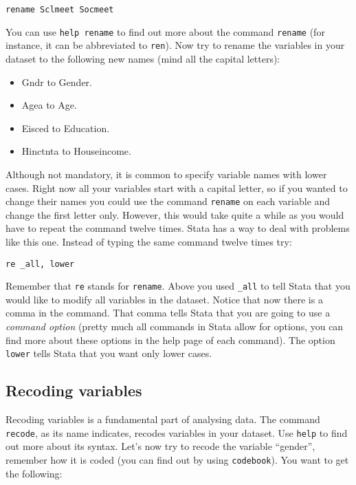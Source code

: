 \documentclass{article}
\begin{document}
\begin{lstlisting}
rename Sclmeet Socmeet
\end{lstlisting}

You can use \texttt{help rename} to find out more about the command \texttt{rename} (for instance, it can be abbreviated to \texttt{ren}). Now try to rename the variables in your dataset to the following new names (mind all the capital letters):

\begin{itemize}
	\item Gndr to Gender.
	\item Agea to Age.
	\item Eisced to Education.
	\item Hinctnta to Houseincome.
\end{itemize}

Although not mandatory, it is common to specify variable names with lower cases. Right now all your variables start with a capital letter, so if you wanted to change their names you could use the command \texttt{rename} on each variable and change the first letter only. However, this would take quite a while as you would have to repeat the command twelve times. Stata has a way to deal with problems like this one. Instead of typing the same command twelve times try:

\begin{lstlisting}
re _all, lower
\end{lstlisting}

Remember that \texttt{re} stands for \texttt{rename}. Above you used \texttt{\_all} to tell Stata that you would like to modify all variables in the dataset. Notice that now there is a comma in the command. That comma tells Stata that you are going to use a \textit{command option} (pretty much all commands in Stata allow for options, you can find more about these options in the help page of each command). The option \texttt{lower} tells Stata that you want only lower cases.

\subsection*{Recoding variables}

Recoding variables is a fundamental part of analysing data. The command \texttt{recode}, as its name indicates, recodes variables in your dataset. Use \texttt{help} to find out more about its syntax. Let's now try to recode the variable ``gender'', remember how it is coded (you can find out by using \texttt{codebook}). You want to get the following:
\end{document}
